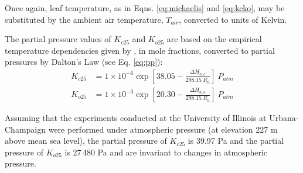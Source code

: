 \noindent Once again, leaf temperature, as in Eqns. \ref{eq:michaelis} and \ref{eq:kcko}, may be substituted by the ambient air temperature, $T_{air}$, converted to units of Kelvin. 

The partial pressure values of $K_{c25}$ and $K_{o25}$ are based on the empirical temperature dependencies given by \cite{bernacchi01}, in mole fractions, converted to partial pressures by Dalton's Law (see Eq. \ref{eq:pp}):
%
%
\begin{subequations}
\label{eq:kcko25}
\begin{align}
	K_{c25}&=1\times 10^{-6} \exp \left[ 38.05 - 
    	\frac{\Delta H_{a,c}}{298.15\: R_{u}}
    \right]\: P_{atm} \label{eq:kc25} \\
    K_{o25}&=1\times 10^{-3} \exp \left[ 20.30 - 
    	\frac{\Delta H_{a,o}}{298.15\: R_{u}}
    \right]\: P_{atm} \label{eq:ko25}
\end{align}
\end{subequations}

\noindent Assuming that the experiments conducted at the University of Illinois at Urbana-Champaign were performed under atmospheric pressure (at elevation 227 m above mean sea level), the partial pressure of $K_{c25}$ is 39.97 Pa and the partial pressure of $K_{o25}$ is 27$\,$480 Pa and are invariant to changes in atmospheric pressure.

